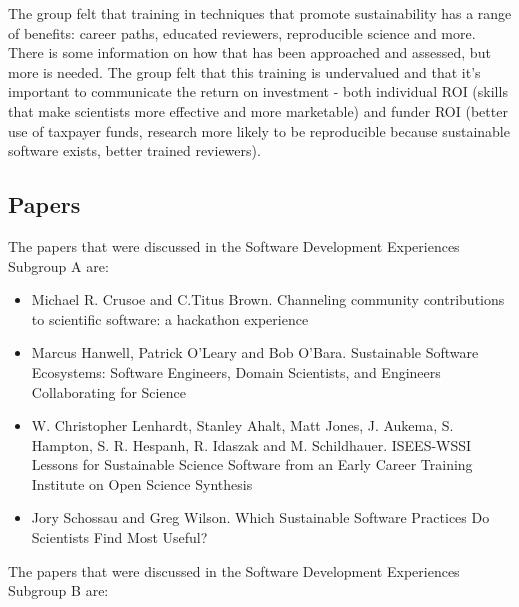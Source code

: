 \documentclass[11pt, oneside]{amsart}
\begin{document}
The group felt that training in techniques that promote sustainability has
a range of benefits: career paths, educated reviewers, reproducible
science and more. There is some information on how that has been
approached and assessed, but more is needed. The group felt that this
training is undervalued and that it's important to communicate the return
on investment - both individual ROI (skills that make scientists more
effective and more marketable) and funder ROI (better use of taxpayer
funds, research more likely to be reproducible because sustainable
software exists, better trained reviewers).



\subsection{Papers}
The papers that were discussed in the Software Development Experiences Subgroup A are:

\begin{itemize}
\item Michael R. Crusoe and C.Titus Brown. Channeling community contributions to
scientific software: a hackathon experience~\cite{wssspe2_crusoe}

\item Marcus Hanwell, Patrick O'Leary and Bob O'Bara. Sustainable Software
Ecosystems: Software Engineers, Domain Scientists, and Engineers Collaborating
for Science~\cite{wssspe2_hanwell}

\item W. Christopher Lenhardt, Stanley Ahalt, Matt Jones, J. Aukema, S. Hampton,
S. R. Hespanh, R. Idaszak and M. Schildhauer. {ISEES-WSSI} Lessons for
Sustainable Science Software from an Early Career Training Institute on Open
Science Synthesis~\cite{wssspe2_lenhardt}

\item Jory Schossau and Greg Wilson. Which Sustainable Software Practices Do
Scientists Find Most Useful?~\cite{wssspe2_schossau}

\end{itemize}

The papers that were discussed in the Software Development Experiences Subgroup
B are:
\end{document}
